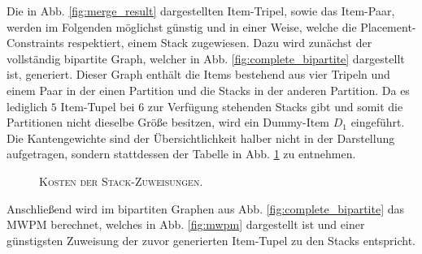 Die in Abb. \ref{fig:merge_result} dargestellten Item-Tripel, sowie das Item-Paar, werden im Folgenden
möglichst günstig und in einer Weise, welche die Placement-Constraints respektiert, einem Stack zugewiesen.
Dazu wird zunächst der vollständig bipartite Graph, welcher in Abb. \ref{fig:complete_bipartite} dargestellt ist,
generiert. Dieser Graph enthält die Items bestehend aus vier Tripeln und einem Paar in der einen Partition
und die Stacks in der anderen Partition.
Da es lediglich $5$ Item-Tupel bei $6$ zur Verfügung stehenden Stacks gibt und somit die Partitionen nicht dieselbe
Größe besitzen, wird ein Dummy-Item $D_1$ eingeführt.
Die Kantengewichte sind der Übersichtlichkeit halber nicht in der Darstellung aufgetragen, sondern stattdessen
der Tabelle in Abb. \ref{fig:item_tuple_costs_three_cap} zu entnehmen.
\begin{figure}[H]
\centering
{}
\caption{\textsc{Kosten der Stack-Zuweisungen}.}
\label{fig:item_tuple_costs_three_cap}
\end{figure}

Anschließend wird im bipartiten Graphen aus Abb. \ref{fig:complete_bipartite} das \textsc{MWPM} berechnet, welches
in Abb. \ref{fig:mwpm} dargestellt ist und einer günstigsten Zuweisung der zuvor generierten Item-Tupel zu den Stacks entspricht.


